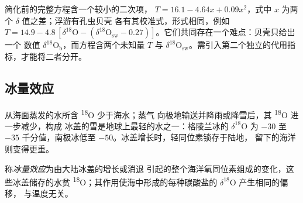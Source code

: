 简化前的完整方程含一个较小的二次项，
$T = 16.1 - 4.64x + 0.09x^2$，式中 $x$ 为两个 $\delta$ 值之差；浮游有孔虫贝壳
各有其校准式，形式相同，例如 $T = 14.9 - 4.8\,[\delta^{18}\mathrm{O} -
(\delta^{18}\mathrm{O}_{\mathrm{sw}} - 0.27)]$。它们共同存在一个难点：贝壳只给出一个
数值 $\delta^{18}\mathrm{O}_{\mathrm{b}}$，而方程含两个未知量 $T$ 与
$\delta^{18}\mathrm{O}_{\mathrm{sw}}$。需引入第二个独立的代用指标，才能将二者分开。

\subsection*{冰量效应}

从海面蒸发的水所含 \textsuperscript{18}O 少于海水；蒸气
向极地输送并降雨或降雪后，其 \textsuperscript{18}O 进一步减少，构成
冰盖的雪是地球上最轻的水之一：格陵兰冰的 $\delta^{18}$O 为 $-30$ 至 $-35$
千分值，南极冰低至 $-50$。冰盖增长时，轻同位素锁存于陆地，
留下的海洋则变得更重。

\begin{definition}[冰量效应]\label{def:b2:climate-proxies:ice-volume}
称\emph{冰量效应}为由大陆冰盖的增长或消退
引起的整个海洋氧同位素组成的变化，这些冰盖储存的水贫
\textsuperscript{18}O；其作用使海中形成的每种碳酸盐的 $\delta^{18}$O 产生相同的偏移，
与温度无关。
\end{definition}

